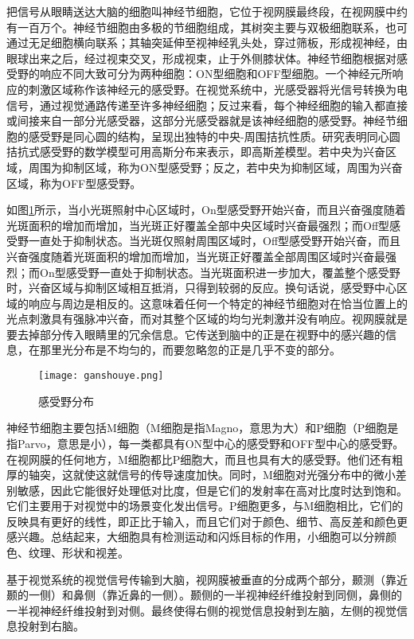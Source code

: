 \documentclass[a4paper,10pt]{article}\large
\begin{document}
把信号从眼睛送达大脑的细胞叫神经节细胞\cite{15:book}，它位于视网膜最终段，在视网膜中约有一百万个。神经节细胞由多极的节细胞组成，其树突主要与双极细胞联系，也可通过无足细胞横向联系；其轴突延伸至视神经乳头处，穿过筛板，形成视神经，由眼球出来之后，经过视束交叉，形成视束，止于外侧膝状体。神经节细胞根据对感受野的响应不同大致可分为两种细胞：ON型细胞和OFF型细胞\cite{5:article}。一个神经元所响应的刺激区域称作该神经元的感受野。在视觉系统中，光感受器将光信号转换为电信号，通过视觉通路传递至许多神经细胞；反过来看，每个神经细胞的输入都直接或间接来自一部分光感受器，这部分光感受器就是该神经细胞的感受野。神经节细胞的感受野是同心圆的结构\cite{17:book}，呈现出独特的中央-周围拮抗性质。研究表明同心圆拮抗式感受野的数学模型可用高斯分布来表示，即高斯差模型。若中央为兴奋区域，周围为抑制区域，称为ON型感受野；反之，若中央为抑制区域，周围为兴奋区域，称为OFF型感受野。


如图\ref{fig 6}所示，当小光斑照射中心区域时，On型感受野开始兴奋，而且兴奋强度随着光斑面积的增加而增加，当光斑正好覆盖全部中央区域时兴奋最强烈；而Off型感受野一直处于抑制状态。当光斑仅照射周围区域时，Off型感受野开始兴奋，而且兴奋强度随着光斑面积的增加而增加，当光斑正好覆盖全部周围区域时兴奋最强烈；而On型感受野一直处于抑制状态。当光斑面积进一步加大，覆盖整个感受野时，兴奋区域与抑制区域相互抵消，只得到较弱的反应。换句话说，感受野中心区域的响应与周边是相反的\cite{16:book}。这意味着任何一个特定的神经节细胞对在恰当位置上的光点刺激具有强脉冲兴奋，而对其整个区域的均匀光刺激并没有响应。视网膜就是要去掉部分传入眼睛里的冗余信息。它传送到脑中的正是在视野中的感兴趣的信息，在那里光分布是不均匀的，而要忽略忽的正是几乎不变的部分。

\begin{figure}[htb]
\centering
\texttt{[image: ganshouye.png]}
\caption{感受野分布}\label{fig 6} 
\end{figure}


神经节细胞主要包括M细胞（M细胞是指Magno，意思为大）和P细胞（P细胞是指Parvo，意思是小）\cite{16:book}，每一类都具有ON型中心的感受野和OFF型中心的感受野。在视网膜的任何地方，M细胞都比P细胞大，而且也具有大的感受野。他们还有粗厚的轴突，这就使这就信号的传导速度加快。同时，M细胞对光强分布中的微小差别敏感，因此它能很好处理低对比度，但是它们的发射率在高对比度时达到饱和。它们主要用于对视觉中的场景变化发出信号。P细胞更多，与M细胞相比，它们的反映具有更好的线性，即正比于输入，而且它们对于颜色、细节、高反差和颜色更感兴趣。总结起来，大细胞具有检测运动和闪烁目标的作用，小细胞可以分辨颜色、纹理、形状和视差。


基于视觉系统的视觉信号传输到大脑，视网膜被垂直的分成两个部分，颞测（靠近颞的一侧）和鼻侧（靠近鼻的一侧）。颞侧的一半视神经纤维投射到同侧，鼻侧的一半视神经纤维投射到对侧。最终使得右侧的视觉信息投射到左脑，左侧的视觉信息投射到右脑。
\end{document}
